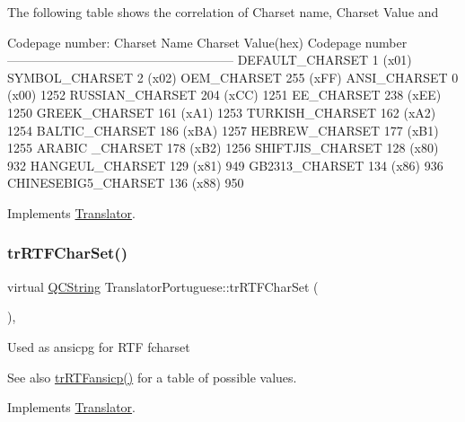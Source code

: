 The following table shows the correlation of Charset name, Charset Value and 
\begin{DoxyPre}
Codepage number:
Charset Name       Charset Value(hex)  Codepage number
------------------------------------------------------
DEFAULT\_CHARSET           1 (x01)
SYMBOL\_CHARSET            2 (x02)
OEM\_CHARSET             255 (xFF)
ANSI\_CHARSET              0 (x00)            1252
RUSSIAN\_CHARSET         204 (xCC)            1251
EE\_CHARSET              238 (xEE)            1250
GREEK\_CHARSET           161 (xA1)            1253
TURKISH\_CHARSET         162 (xA2)            1254
BALTIC\_CHARSET          186 (xBA)            1257
HEBREW\_CHARSET          177 (xB1)            1255
ARABIC \_CHARSET         178 (xB2)            1256
SHIFTJIS\_CHARSET        128 (x80)             932
HANGEUL\_CHARSET         129 (x81)             949
GB2313\_CHARSET          134 (x86)             936
CHINESEBIG5\_CHARSET     136 (x88)             950
\end{DoxyPre}
 

Implements \mbox{\hyperlink{class_translator_a9953a4c0e6a4fc7d017abcd5c2939e0f}{Translator}}.

\mbox{\label{class_translator_portuguese_a92a1e1d2fe9a64af40a2c7c65115b3ff}} 
\subsubsection{\texorpdfstring{trRTFCharSet()}{trRTFCharSet()}}
{\footnotesize\ttfamily virtual \mbox{\hyperlink{class_q_c_string}{Q\+C\+String}} Translator\+Portuguese\+::tr\+R\+T\+F\+Char\+Set (\begin{DoxyParamCaption}{ }\end{DoxyParamCaption})\hspace{0.3cm}{\ttfamily [inline]}, {\ttfamily [virtual]}}

Used as ansicpg for R\+TF fcharset \begin{DoxySeeAlso}{See also}
\mbox{\hyperlink{class_translator_portuguese_aebdebcd3a2bcbb38b22b98a7fc92af79}{tr\+R\+T\+Fansicp()}} for a table of possible values. 
\end{DoxySeeAlso}


Implements \mbox{\hyperlink{class_translator_afad391f3cbfb5ce6332b7239f8e2049a}{Translator}}.

